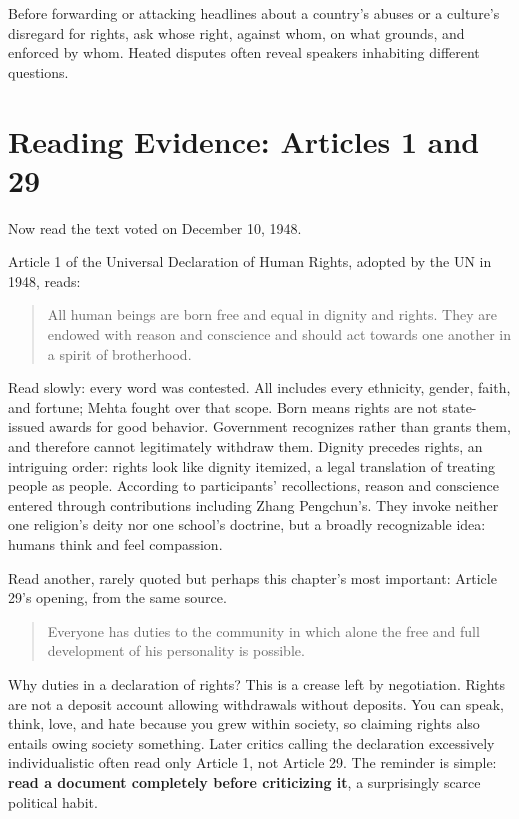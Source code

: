 Before forwarding or attacking headlines about a country's abuses or a culture's disregard for rights, ask whose right, against whom, on what grounds, and enforced by whom. Heated disputes often reveal speakers inhabiting different questions.

\section{Reading Evidence: Articles 1 and 29}
Now read the text voted on December 10, 1948.

Article 1 of the Universal Declaration of Human Rights, adopted by the UN in 1948, reads:

\begin{quote}
All human beings are born free and equal in dignity and rights. They are endowed with reason and conscience and should act towards one another in a spirit of brotherhood.
\end{quote}
Read slowly: every word was contested. All includes every ethnicity, gender, faith, and fortune; Mehta fought over that scope. Born means rights are not state-issued awards for good behavior. Government recognizes rather than grants them, and therefore cannot legitimately withdraw them. Dignity precedes rights, an intriguing order: rights look like dignity itemized, a legal translation of treating people as people. According to participants' recollections, reason and conscience entered through contributions including Zhang Pengchun's. They invoke neither one religion's deity nor one school's doctrine, but a broadly recognizable idea: humans think and feel compassion.

Read another, rarely quoted but perhaps this chapter's most important: Article 29's opening, from the same source.

\begin{quote}
Everyone has duties to the community in which alone the free and full development of his personality is possible.
\end{quote}
Why duties in a declaration of rights? This is a crease left by negotiation. Rights are not a deposit account allowing withdrawals without deposits. You can speak, think, love, and hate because you grew within society, so claiming rights also entails owing society something. Later critics calling the declaration excessively individualistic often read only Article 1, not Article 29. The reminder is simple: \textbf{read a document completely before criticizing it}, a surprisingly scarce political habit.

